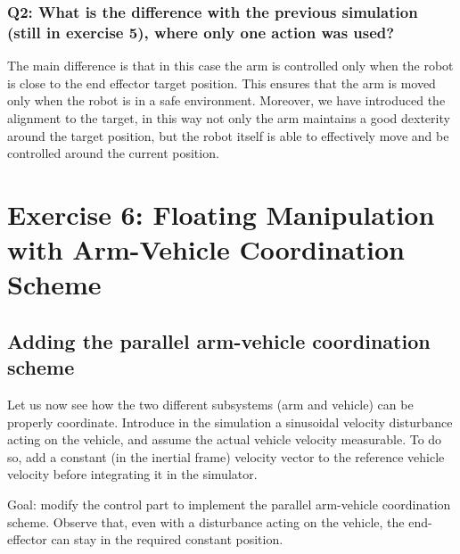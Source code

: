 \documentclass{article}
\begin{document}
\subsubsection{Q2: What is the difference with the previous simulation (still in exercise 5), where only one action was used?}
The main difference is that in this case the arm is controlled only when the robot is close to the end effector target position. This ensures that the arm is moved only when the robot is in a safe environment. 
Moreover, we have introduced the alignment to the target, in this way not only the arm maintains a good dexterity around the target position, but the robot itself is able to effectively move and be controlled around the current position. 
\clearpage



\section{Exercise 6: Floating Manipulation with Arm-Vehicle Coordination Scheme}
\subsection{Adding the parallel arm-vehicle coordination scheme}
Let us now see how the two different subsystems (arm and vehicle) can be properly coordinate. Introduce in the simulation a sinusoidal velocity disturbance acting on the vehicle, and assume the actual vehicle velocity measurable. To do so, add a constant (in the inertial frame) velocity vector to the reference vehicle velocity before integrating it in the simulator.

Goal: modify the control part to implement the parallel arm-vehicle coordination scheme. Observe that, even with a disturbance acting on the vehicle, the end-effector can stay in the required constant position.
\end{document}
